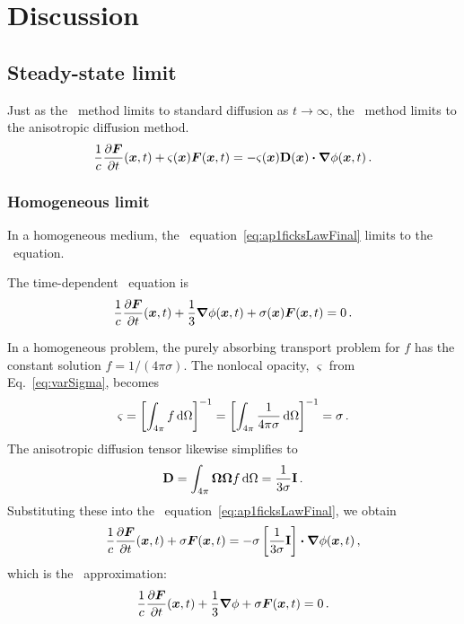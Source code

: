 \section{Discussion}



\subsection{Steady-state limit}
Just as the \Pone\ method limits to standard diffusion as $t\to\infty$, the
\APone\ method limits to the anisotropic diffusion method.
\begin{equation*}
  \frac{1}{c}\frac{\partial \bm{F}}{\partial t}(\bm{x},t) + \varsigma(\bm{x})\bm{F}(\bm{x},t) 
  = - \varsigma(\bm{x}) \mathbf{D}(\bm{x}) \bm{\cdot} \bm{\nabla} \phi(\bm{x}, t) \,.
\end{equation*}

\subsubsection{Homogeneous limit}
In a homogeneous medium, the \APone\ equation~\eqref{eq:ap1ficksLawFinal} limits
to the \Pone\ equation.

The time-dependent \Pone\ equation is
\begin{equation*}
  \frac{1}{c}\frac{\partial \bm{F}}{\partial t}(\bm{x},t)
  + \frac{1}{3} \bm{\nabla} \phi(\bm{x}, t)
  + \sigma(\bm{x})\bm{F}(\bm{x},t) 
  = 0 \,.
\end{equation*}

In a homogeneous problem, the purely absorbing transport problem for $f$ has the
constant solution $f=1/(4\pi\sigma)$. The nonlocal opacity, $\varsigma$ from
Eq.~\eqref{eq:varSigma}, becomes
\begin{equation*}
  \varsigma
  = \left[ \int_{4\pi} f \mathop{}\!\mathrm{d} \Omega \right]^{-1}
  = \left[ \int_{4\pi} \frac{1}{4\pi\sigma} \mathop{}\!\mathrm{d} \Omega \right]^{-1}
  = \sigma \,.
\end{equation*}
The anisotropic diffusion tensor likewise simplifies to
\begin{equation*}
  \mathbf{D} = \int_{4\pi} \bm{\Omega}\bm{\Omega} f \mathop{}\!\mathrm{d} \Omega =
  \frac{1}{3\sigma}\mathbf{I} \,.
\end{equation*}
Substituting these into the \APone\ equation~\eqref{eq:ap1ficksLawFinal}, we obtain
\begin{equation*}
  \frac{1}{c}\frac{\partial \bm{F}}{\partial t}(\bm{x},t) + \sigma\bm{F}(\bm{x},t) 
  = - \sigma \left[ \frac{1}{3\sigma}\mathbf{I} \right]
  \bm{\cdot} \bm{\nabla} \phi(\bm{x}, t) \,,
\end{equation*}
which is the \Pone\ approximation:
\begin{equation*}
  \frac{1}{c}\frac{\partial \bm{F}}{\partial t}(\bm{x},t) + \frac{1}{3} \bm{\nabla} \phi
  + \sigma\bm{F}(\bm{x},t) 
  = 0\,.
\end{equation*}

